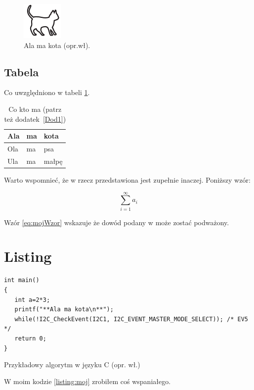 \begin{figure}
\centering\includegraphics[width=.4\textwidth]{img/kotek}
\caption{Ala ma kota (opr.wł).}\label{rysunek:kot}
\end{figure}
\subsection{Tabela}

Co uwzględniono w tabeli \ref{tabela:coktoma}. \lipsum[13-15] 

\begin{table}
\centering\caption{Co kto ma \cite{harel_rzecz_2008} (patrz też dodatek~\ref{Dod1}) \label{tabela:coktoma}}
\begin{tabular}{|l|l|l|}%
\hline
Ala & ma & kota \\
\hline
Ola & ma & psa \\
\hline
Ula & ma & małpę\\
\hline
\end{tabular}
\end{table}

\lipsum[19-20] Warto wspomnieć, że w \cite{aizawa_groundwater_2009} rzecz przedstawiona jest zupełnie inaczej. Poniższy wzór:

\begin{equation}
\sum_{i=1}^{\infty}a_i
\label{eq:mojWzor}
\end{equation}

Wzór \ref{eq:mojWzor} wskazuje że dowód podany w \cite{kaleta_experimental_2005} może zostać podważony. \lipsum[9]

\section{Listing}

\begin{listing}
\begin{verbatim} 
int main()
{
   int a=2*3;
   printf("**Ala ma kota\n**");
   while(!I2C_CheckEvent(I2C1, I2C_EVENT_MASTER_MODE_SELECT)); /* EV5 */
   return 0;
}
\end{verbatim}
\caption{Przykładowy algorytm w języku C (opr. wł.)} \label{listing:moj}
\end{listing}

W moim kodzie \ref{listing:moj} zrobiłem coś wspaniałego. \lipsum[4]
